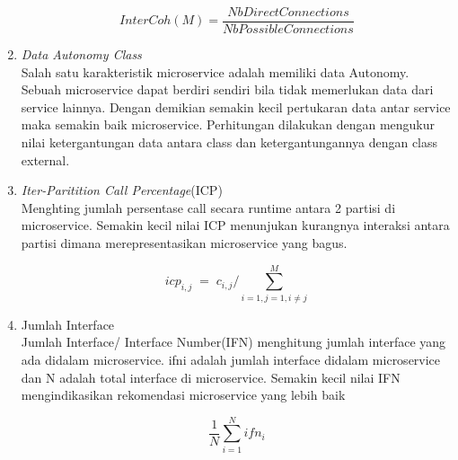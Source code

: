 \begin{enumerate}[leftmargin=1.3cm]
	\begin{equation}
		I n t e r C o h(M)=\frac{N b D i r e c t C o n n e c t i o n s}{N b P o s s i b l e C o n n e c t i o n s}
	\end{equation}
	
	\item \textit{Data Autonomy Class} \cite{5B1}\\
	Salah satu karakteristik microservice adalah memiliki data Autonomy. Sebuah microservice dapat berdiri sendiri bila tidak memerlukan data dari service lainnya. Dengan demikian semakin kecil pertukaran data antar service maka semakin baik microservice. Perhitungan dilakukan dengan mengukur nilai ketergantungan data antara class dan ketergantungannya dengan class external.
	
	\item \textit{Iter-Paritition Call Percentage}(ICP) \cite{ECD} \\
	Menghting jumlah persentase call secara runtime antara 2 partisi di microservice. Semakin kecil nilai ICP menunjukan kurangnya interaksi antara partisi dimana merepresentasikan microservice yang bagus.	

	\begin{equation}
		i c p_{i,j}\;=\;c_{i,j}/{\sum_{i=1,j=1,i\neq j}^{M}}
	\end{equation}	

	\item Jumlah Interface \cite{ECD} \\
	Jumlah Interface/ Interface Number(IFN) menghitung jumlah interface yang ada didalam microservice. ifni adalah jumlah interface didalam microservice dan N adalah total interface di microservice. Semakin kecil nilai IFN mengindikasikan rekomendasi microservice yang lebih baik

	\begin{equation}
		{\frac{1}{N}}\sum_{i=1}^{N}i f n_{i}
	\end{equation}

\end{enumerate}	

